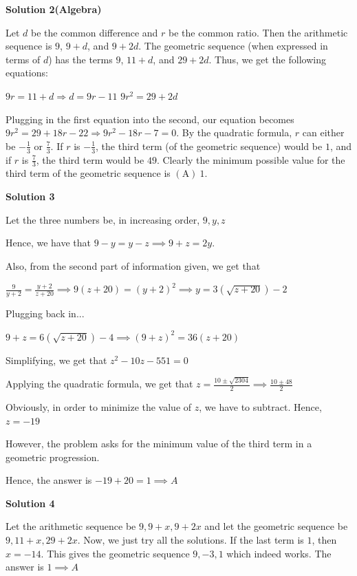 \begin{enumerate}
 



\textbf{Solution 2(Algebra)}

Let $d$ be the common difference and $r$ be the common ratio. Then the arithmetic sequence is $9$, $9+d$, and $9+2d$. The geometric sequence (when expressed in terms of $d$) has the terms $9$, $11+d$, and $29+2d$.  Thus, we get the following equations:

 $9r=11+d\Rightarrow d=9r-11$
$9r^2=29+2d$

 Plugging in the first equation into the second, our equation becomes $9r^2=29+18r-22\Longrightarrow9r^2-18r-7=0$. By the quadratic formula, $r$ can either be $-\frac{1}{3}$ or $\frac{7}{3}$.  If $r$ is $-\frac{1}{3}$, the third term (of the geometric sequence) would be $1$, and if $r$ is $\frac{7}{3}$, the third term would be $49$.  Clearly the minimum possible value for the third term of the geometric sequence is $\boxed{\mathrm{(A)}\ 1}$.

 



\textbf{Solution 3}

Let the three numbers be, in increasing order, $9,y,z$

 Hence, we have that $9-y=y-z\implies 9+z=2y$.

 Also, from the second part of information given, we get that

 $\frac{9}{y+2}=\frac{y+2}{z+20}\implies 9(z+20)=(y+2)^2\implies y=3(\sqrt{z+20})-2$

 Plugging back in...

 $9+z=6(\sqrt{z+20})-4\implies (9+z)^2=36(z+20)$

 Simplifying, we get that $z^2-10z-551=0$

 Applying the quadratic formula, we get that $z=\frac{10\pm \sqrt{2304}}{2}\implies \frac{10\pm48}{2}$

 Obviously, in order to minimize the value of $z$, we have to subtract. Hence, $z=-19$

 However, the problem asks for the minimum value of the third term in a geometric progression.

 Hence, the answer is $-19+20=\boxed{1} \implies \boxed{A}$




\textbf{Solution 4}

Let the arithmetic sequence be $9,9+x,9+2x$ and let the geometric sequence be $9,11+x,29+2x$. Now, we just try all the solutions. If the last term is $1$, then $x=-14$. This gives the geometric sequence $9,-3,1$ which indeed works. The answer is $\boxed{1} \implies \boxed{A}$


\end{enumerate}
